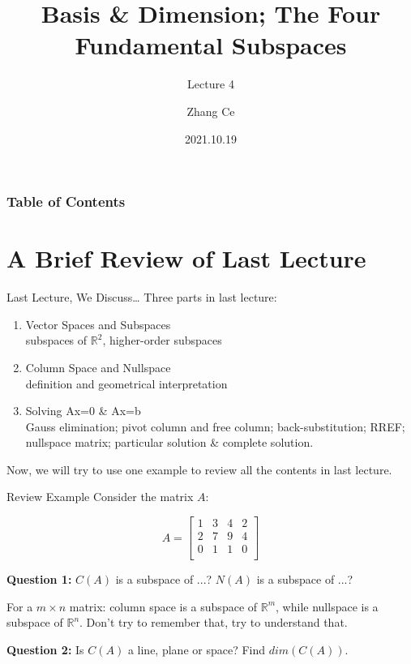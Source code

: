 \documentclass{beamer}
\title[Linear Algebra] %
{Basis \& Dimension; The Four Fundamental Subspaces}
\subtitle{Lecture 4}
\author[11910803@mail.sustech.edu.cn] %
{
    Zhang Ce
}
\institute[] %
{
    Department of Electrical and Electronic Engineering\\
    Southern University of Science and Technology
}
\date[2021.10.19] %
{2021.10.19}
\begin{document}
\frame{\titlepage}


\begin{frame}
\frametitle{Table of Contents}
\tableofcontents
\end{frame}
\section{A Brief Review of Last Lecture}
\begin{frame}{Last Lecture, We Discuss\dots}
Three parts in last lecture:
    \begin{enumerate}
        \item Vector Spaces and Subspaces\\
        subspaces of $\mathbb{R}^2$, higher-order subspaces
        \item Column Space and Nullspace\\
        definition and geometrical interpretation
        \item Solving Ax=0 \& Ax=b\\
        Gauss elimination; pivot column and free column; back-substitution; RREF; nullspace matrix; particular solution \& complete solution.
    \end{enumerate}

Now, we will try to use one example to review all the contents in last lecture.
\end{frame}

\begin{frame}{Review Example}
Consider the matrix $A$:

\begin{equation*}
    A=\left[ \begin{matrix}
        1&		3&		4&		2\\
        2&		7&		9&		4\\
        0&		1&		1&		0\\
    \end{matrix} \right]
\end{equation*}

\textbf{Question 1:} $C(A)$ is a subspace of ...? $N(A)$ is a subspace of ...?

\vspace{3pt}
For a $m\times n$ matrix: column space is a subspace of $\mathbb{R}^m$, while nullspace is a subspace of $\mathbb{R}^n$.
Don't try to remember that, try to understand that.

\vspace{5pt}
\textbf{Question 2:} Is $C(A)$ a line, plane or space? Find $dim(C(A))$.



\end{frame}
\end{document}

